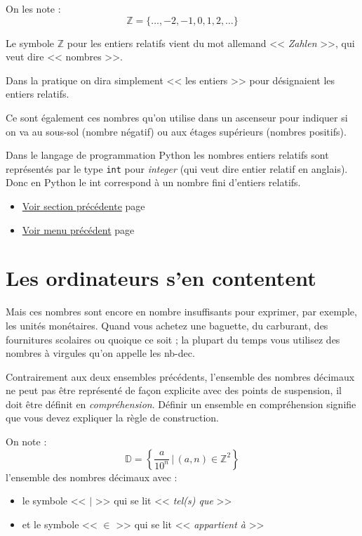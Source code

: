\documentclass[a4paper,11pt]{book}
\begin{document}
On les note :
\[\mathbb{Z} = \{\dots, -2, -1, 0, 1, 2, \dots\}\]

Le symbole \(\mathbb{Z}\) pour les entiers relatifs vient du mot
allemand << \emph{Zahlen} >>, qui veut dire << nombres >>.

Dans la pratique on dira simplement << les entiers >> pour désignaient
les entiers relatifs.

Ce sont également ces nombres qu'on utilise dans un ascenseur pour
indiquer si on va au sous-sol (nombre négatif) ou aux étages
supérieurs (nombres positifs).

Dans le langage de programmation Python les nombres entiers
relatifs sont représentés par le type \texttt{int} pour
\emph{integer} (qui veut dire entier relatif en anglais). Donc en Python le
\gls{int} correspond à un nombre fini d'entiers
relatifs. 

\begin{itemize}
\item \hyperref[orgfb34aa0]{Voir section précédente}
page~\pageref{page:sec2.1.1digits}
\item \hyperref[orga5086f2]{Voir menu précédent}
page~\pageref{page:content1-menu}
\end{itemize}

\clearpage

\section{Les ordinateurs s'en contentent}
\label{sec:org22bc18d}
\label{org1213e07}
\label{page:sec2.1.3cpu}

Mais ces nombres sont encore en nombre insuffisants pour exprimer,
par exemple, les unités monétaires. Quand vous achetez une baguette,
du carburant, des fournitures scolaires ou quoique ce soit ; la
plupart du temps vous utilisez des nombres à virgules qu'on appelle
les \gls{nb-dec}.

Contrairement aux deux ensembles précédents, l'ensemble des nombres
décimaux ne peut pas être représenté de façon explicite avec des
points de suspension, il doit être définit en \emph{compréhension}. Définir
un ensemble en compréhension signifie que vous devez expliquer la
règle de construction.

On note :
\[\mathbb{D} = \left\{ \dfrac{a}{10^n}\,|\,(a, n)\in\mathbb{Z}^2\right\}\]
l'ensemble des nombres décimaux avec :
\begin{itemize}
\item le symbole <<  \(|\)  >> qui se lit <<  \emph{tel(s) que}  >>
\item et le symbole <<  \(\in\)  >> qui se lit << \emph{appartient à} >>
\end{itemize}
\end{document}
